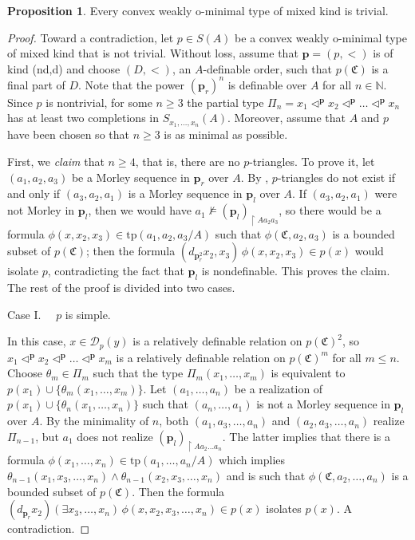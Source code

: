 \documentclass{amsart}
\theoremstyle{definition}
\newtheorem{Proposition}[Theorem]{Proposition}
\theoremstyle{definition}
\def\strok{\restriction}
\newcommand{\Mon}{\mathfrak C}
\newcommand{\tp}{\mathrm{tp}}
\begin{document}
\begin{Proposition}\label{Proposition mixed kind is trivial}
Every convex weakly o-minimal type of mixed kind is trivial. 
\end{Proposition} 
\begin{proof}
Toward a contradiction, let $p\in S(A)$ be a convex weakly o-minimal type of mixed kind that is not trivial. Without loss, assume that $\mathbf p=(p,<)$ is of kind (nd,d) and choose $(D,<)$, an $A$-definable order, such that $p(\Mon)$ is a final part of $D$. Note that the power $(\mathbf p_r)^n$ is definable over $A$ for all $n\in \mathbb N$.  
Since $p$ is nontrivial, for some $n\geqslant 3$ the partial type $\Pi_n=x_1\triangleleft^{\mathbf p}x_2\triangleleft^{\mathbf p}\ldots\triangleleft^{\mathbf p}x_n$ has at least two completions in $S_{x_1,\dots,x_n}(A)$. Moreover, assume that $A$ and $p$ have been chosen so that $n\geqslant 3$ is as minimal as possible. 


First, we {\it claim} that $n\geqslant 4$, that is, there are no $p$-triangles. To prove it, let $(a_1,a_2,a_3)$ be a Morley sequence in $\mathbf p_r$ over $A$. 
By \cite[Lemma 5.9]{MTwqom1}, $p$-triangles do not exist if and only if $(a_3,a_2,a_1)$ is a Morley sequence in $\mathbf p_l$ over $A$.  
If $(a_3,a_2,a_1)$ were not Morley in $\mathbf p_l$, then we would have $a_1\not\models (\mathbf p_l)_{\strok Aa_2a_3}$, so there would be a formula $\phi(x,x_2,x_3)\in \tp(a_1,a_2,a_3/A)$ such that $\phi(\Mon,a_2,a_3)$ is a bounded subset of $p(\Mon)$; 
then the formula $(d_{\mathbf p_r^2} x_2,x_3)\,\phi(x,x_2,x_3)\in p(x)$ would isolate $p$, 
contradicting the fact that $\mathbf p_l$ is nondefinable. This proves the claim. The rest of the proof is divided into two cases.

Case I.  \ \ $p$ is simple. 

In this case, $x\in\mathcal D_p(y)$ is a relatively definable relation on $p(\Mon)^2$, so
$x_1\triangleleft^{\mathbf p}x_2\triangleleft^{\mathbf p}\ldots\triangleleft^{\mathbf p}x_m$ is a relatively definable relation on
$p(\Mon)^m$ for all $m\leqslant n$. Choose $\theta_m\in \Pi_m$ such that the type $\Pi_m(x_1,\dots,x_m)$ is equivalent to $p(x_1)\cup\{\theta_m(x_1,\dots,x_m)\}$. Let $(a_1,\dots,a_n)$ be a realization of $p(x_1)\cup\{\theta_n(x_1,\dots,x_n)\}$ such that $(a_n,\dots,a_1)$ is not a Morley sequence in $\mathbf p_l$ over $A$. By the minimality of $n$, both $(a_1,a_3,\dots,a_n)$ and $(a_2,a_3,\dots,a_n)$ realize $\Pi_{n-1}$, but $a_1$ does not realize $(\mathbf p_l)_{\strok Aa_2\dots a_n}$. 
The latter implies that there is a formula $\phi(x_1,\dots,x_n)\in \tp(a_1,\dots,a_n/A)$ which implies $\theta_{n-1}(x_1,x_3,\dots,x_n)\land \theta_{n-1}(x_2,x_3,\dots,x_n)$ and is such that $\phi(\Mon,a_2,\dots,a_n)$ is a bounded subset of $p(\Mon)$.  
Then the formula $(d_{\mathbf p_r} x_2)(\exists x_3,\dots,x_n)\,\phi(x,x_2,x_3,\dots,x_n)\in p(x)$ isolates $p(x)$. A contradiction.


\end{proof}
\end{document}
